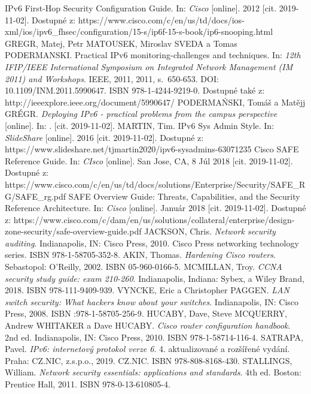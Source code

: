 \begin{literatura}{99}
IPv6 First-Hop Security Configuration Guide. In: \textit{Cisco} [online]. 2012 [cit. 2019-11-02]. Dostupné z: https://www.cisco.com/c/en/us/td/docs/ios-xml/ios/ipv6\_fhsec/configuration/15-s/ip6f-15-s-book/ip6-snooping.html
GREGR, Matej, Petr MATOUSEK, Miroslav SVEDA a Tomas PODERMANSKI. Practical IPv6 monitoring-challenges and techniques. In: \textit{12th IFIP/IEEE International Symposium on Integrated Network Management (IM 2011) and Workshops}. IEEE, 2011, 2011, s.~650-653. DOI: 10.1109/INM.2011.5990647. ISBN 978-1-4244-9219-0. Dostupné také z: http://ieeexplore.ieee.org/document/5990647/
PODERMAŃSKI, Tomáš a Matějj GRÉGR. \textit{Deploying IPv6 - practical problems from the campus perspective} [online]. In: . [cit. 2019-11-02].
MARTIN, Tim. IPv6 Sys Admin Style. In: \textit{SlideShare} [online]. 2016 [cit. 2019-11-02]. Dostupné z: https://www.slideshare.net/tjmartin2020/ipv6-sysadmins-63071235
Cisco SAFE Reference Guide. In: \textit{CIsco} [online]. San Jose, CA, 8 Júl 2018 [cit. 2019-11-02]. Dostupné z: https://www.cisco.com/c/en/us/td/docs/solutions/Enterprise/Security/SAFE\_RG/SAFE\_rg.pdf
SAFE Overview Guide: Threats, Capabilities, and the Security Reference Architecture. In: \textit{Cisco} [online]. Január 2018 [cit. 2019-11-02]. Dostupné z: https://www.cisco.com/c/dam/en/us/solutions/collateral/enterprise/design-zone-security/safe-overview-guide.pdf
JACKSON, Chris. \textit{Network security auditing}. Indianapolis, IN: Cisco Press, 2010. Cisco Press networking technology series. ISBN 978-1-58705-352-8.
AKIN, Thomas. \textit{Hardening Cisco routers}. Sebastopol: O'Reilly, 2002. ISBN 05-960-0166-5.
MCMILLAN, Troy. \textit{CCNA security study guide: exam 210-260}. Indianapolis, Indiana: Sybex, a Wiley Brand, 2018. ISBN 978-111-9409-939.
VYNCKE, Eric a Christopher PAGGEN. \textit{LAN switch security: What hackers know about your switches}. Indianapolis, IN: Cisco Press, 2008. ISBN :978-1-58705-256-9.
HUCABY, Dave, Steve MCQUERRY, Andrew WHITAKER a Dave HUCABY. \textit{Cisco router configuration handbook}. 2nd ed. Indianapolis, IN: Cisco Press, 2010. ISBN 978-1-58714-116-4.
SATRAPA, Pavel. \textit{IPv6: internetový protokol verze 6}. 4. aktualizované a rozšířené vydání. Praha: CZ.NIC, z.s.p.o., 2019. CZ.NIC. ISBN 978-808-8168-430.
STALLINGS, William. \textit{Network security essentials: applications and standards}. 4th ed. Boston: Prentice Hall, 2011. ISBN 978-0-13-610805-4.


\end{literatura}


